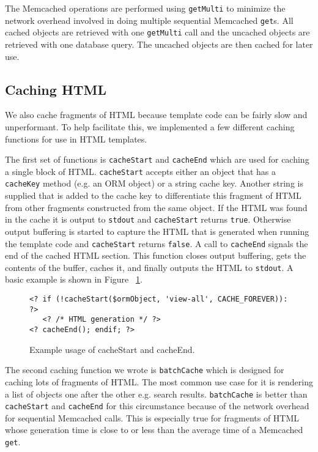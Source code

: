 \documentclass[12pt]{ucthesis}
\begin{document}
The {\textsf Memcached} operations are performed using {\tt getMulti} to minimize the network overhead involved in doing multiple sequential {\textsf Memcached} {\tt get}s.
All cached objects are retrieved with one {\tt getMulti} call and the uncached objects are retrieved with one database query.
The uncached objects are then cached for later use.


\subsection{Caching HTML}
We also cache fragments of HTML because template code can be fairly slow and unperformant.
To help facilitate this, we implemented a few different caching functions for use in HTML templates.

The first set of functions is {\tt cacheStart} and {\tt cacheEnd} which are used for caching a single block of HTML.
{\tt cacheStart} accepts either an object that has a {\tt cacheKey} method (e.g. an ORM object) or a string cache key.
Another string is supplied that is added to the cache key to differentiate this fragment of HTML from other fragments constructed from the same object.
If the HTML was found in the cache it is output to {\tt stdout} and {\tt cacheStart} returns {\tt true}.
Otherwise output buffering is started to capture the HTML that is generated when running the template code and {\tt cacheStart} returns {\tt false}.
A call to {\tt cacheEnd} signals the end of the cached HTML section.
This function closes output buffering, gets the contents of the buffer, caches it, and finally outputs the HTML to {\tt stdout}.
A basic example is shown in Figure ~\ref{fig:cacheStartExample}.

\begin{figure}[h]
\begin{verbatim}
<? if (!cacheStart($ormObject, 'view-all', CACHE_FOREVER)): ?>
   <? /* HTML generation */ ?>
<? cacheEnd(); endif; ?>
\end{verbatim}
\caption{Example usage of cacheStart and cacheEnd.}
\label{fig:cacheStartExample}
\end{figure}

The second caching function we wrote is {\tt batchCache} which is designed for caching lots of fragments of HTML.
The most common use case for it is rendering a list of objects one after the other e.g. search results.
{\tt batchCache} is better than {\tt cacheStart} and {\tt cacheEnd} for this circumstance because of the network overhead for sequential {\textsf Memcached} calls.
This is especially true for fragments of HTML whose generation time is close to or less than the average time of a {\textsf Memcached} {\tt get}.
\end{document}
